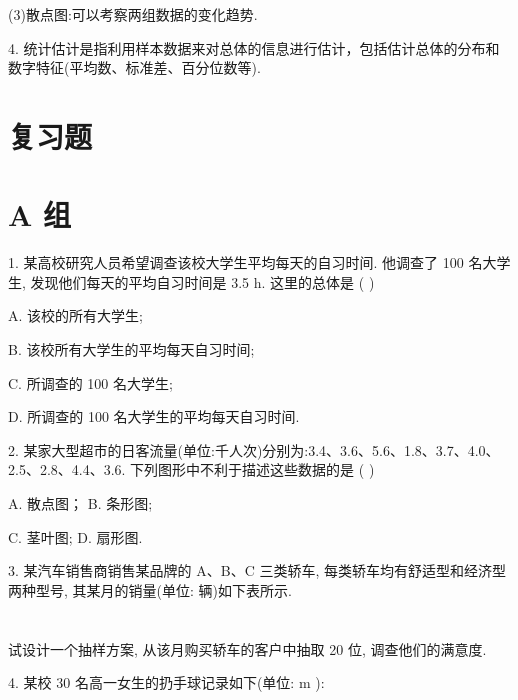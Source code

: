 \documentclass[10pt]{article}
\begin{document}
(3)散点图:可以考察两组数据的变化趋势.

4. 统计估计是指利用样本数据来对总体的信息进行估计，包括估计总体的分布和数字特征(平均数、标准差、百分位数等).

\section*{复习题}

\section*{A 组}

1. 某高校研究人员希望调查该校大学生平均每天的自习时间. 他调查了 100 名大学生, 发现他们每天的平均自习时间是 3.5 h. 这里的总体是 ( )

A. 该校的所有大学生;

B. 该校所有大学生的平均每天自习时间;

C. 所调查的 100 名大学生;

D. 所调查的 100 名大学生的平均每天自习时间.

2. 某家大型超市的日客流量(单位:千人次)分别为:3.4、3.6、5.6、1.8、3.7、4.0、 2.5、2.8、4.4、3.6. 下列图形中不利于描述这些数据的是 ( )

A. 散点图； B. 条形图;

C. 茎叶图; D. 扇形图.

3. 某汽车销售商销售某品牌的 A、B、C 三类轿车, 每类轿车均有舒适型和经济型两种型号, 其某月的销量(单位: 辆)如下表所示.

\section*{}

\begin{center}
\end{center}

试设计一个抽样方案, 从该月购买轿车的客户中抽取 20 位, 调查他们的满意度.

4. 某校 30 名高一女生的扔手球记录如下(单位: \(\mathrm{m}\) ):

\begin{center}
\end{center}
\end{document}
